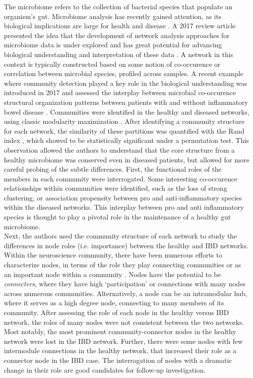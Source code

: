 \indent The microbiome refers to the collection of bacterial species that populate an organism's gut. Microbiome analysis has recently gained attention, as its biological implications are large for health and disease \cite{gut}. A 2017 review article presented the idea that the development of network analysis approaches for microbiome data is under explored and has great potential for advancing biological understanding and interpretation of these data \cite{networkMicrobiome}. A network in this context is typically constructed based on some notion of co-occurence or correlation between microbial species, profiled across samples. A recent example where community detection played a key role in the biological understanding was introduced in 2017 and assessed the interplay between microbial co-occurence structural organization patterns between patients with and without inflammatory bowel disease \cite{moduleMicrobiome}. Communities were identified in the healthy and diseased networks, using classic modularity maximization \cite{girvancommunity}. After identifying a community structure for each network, the similarity of these partitions was quantified with the Rand index \cite{Rand}, which showed to be statistically significant under a permutation test. This observation allowed the authors to understand that the core structure from a healthy microbiome was conserved even in diseased patients, but allowed for more careful probing of the subtle differences. First, the functional roles of the members in each community were interrogated. Some interesting co-occurence relationships within communities were identified, such as the loss of strong clustering, or association propensity between pro and anti-inflammatory species within the diseased networks. This interplay between pro and anti inflammatory species is thought to play a pivotal role in the maintenance of a healthy gut microbiome. \\
\indent Next, the authors used the community structure of each network to study the differences in node roles (i.e. importance) between the healthy and IBD networks. Within the neuroscience community, there have been numerous efforts to characterize nodes, in terms of the role they play connecting communities or as an important node within a community \cite{hub}. Nodes have the potential to be \emph{connecters}, where they have high `participation' or connections with many nodes across numerous communities. Alternatively, a node can be an intramodular hub, where it serves as a high degree node, connecting to many members of its community. After assessing the role of each node in the healthy versus IBD network, the roles of many nodes were not consistent between the two networks. Most notably, the most prominent community-connector nodes in the healthy network were lost in the IBD network. Further, there were some nodes with few intermodule connections in the healthy network, that increased their role as a connector node in the IBD case. The interrogation of nodes with a dramatic change in their role are good candidates for follow-up investigation. \\
